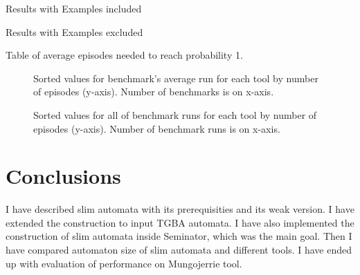 \documentclass[
	digital,
nolof, nolot
]{fithesis3}
\begin{document}
	\begin{table}[ht]
		\centering
		\label{Table:mungostats}
		\caption{Results with Examples included}
		
	\end{table}
	
	\begin{table}[ht]
		\centering
		\label{Table:mungostatsnoex}
		\caption{Results with Examples excluded }
		
	\end{table}
	
	\begin{table}[ht]
		\centering
		\label{Table:mungobenchmarks}
		\caption{Table of average episodes needed to reach probability 1.}
		
	\end{table}
	
	\begin{figure}[ht]
		\centering
		\label{Cactus:mungoaverage}
		\caption{Sorted values for benchmark's average run for each tool by number of episodes (y-axis). Number of benchmarks is on x-axis. }
		
	\end{figure}
	\begin{figure}
		\centering
		\label{Cactus:mungoruns}
		\caption{Sorted values for all of benchmark runs for each tool by number of episodes (y-axis). Number of benchmark runs is on x-axis. }
	
	\end{figure}
	
	\chapter{Conclusions}
	
	I have described slim automata with its prerequisities and its weak version.
	I have extended the construction to input TGBA automata.
	I have also implemented the construction of slim automata inside Seminator, which was the main goal.
	Then I have compared automaton size of slim automata and different tools.
	I have ended up with evaluation of performance on Mungojerrie tool.
\end{document}
